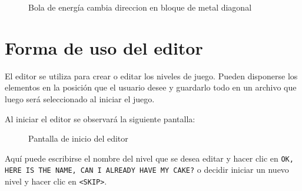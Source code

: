 \documentclass[a4paper]{article}
\begin{document}
\begin{figure}[!h]
	\caption{Bola de energía cambia direccion en bloque de metal diagonal}
	\label{fig:diagrama15}
\end{figure}

\newpage 

\section{Forma de uso del editor}
El editor se utiliza para crear o editar los niveles de juego. Pueden disponerse los elementos en la posición que el usuario desee y guardarlo todo en un archivo que luego será seleccionado al iniciar el juego.

Al iniciar el editor se observará la siguiente pantalla:

\begin{figure}[!h]
	\caption{Pantalla de inicio del editor}
	\label{fig:diagrama16}
\end{figure}

Aquí puede escribirse el nombre del nivel que se desea editar y hacer clic en \texttt{OK, HERE IS THE NAME, CAN I ALREADY HAVE MY CAKE?} o decidir iniciar un nuevo nivel y hacer clic en \texttt{<SKIP>}. 
\end{document}
